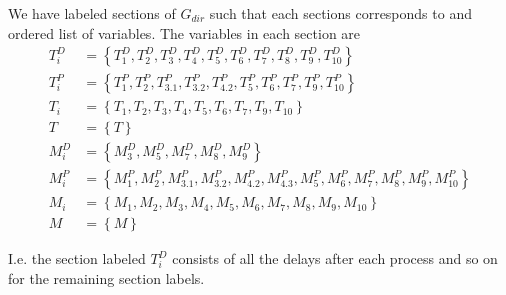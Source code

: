 \documentclass[../Thesis.tex]{subfiles}
\begin{document}
We have labeled sections of $G_{dir}$ such that each sections corresponds to and ordered list of variables. The variables in each section are
\begin{equation}\label{eq:Cycle data sets of variables}
    \begin{aligned}
        T_i^D & = \left\{ T^D_1, T^D_2, T^D_3, T^D_4, T^D_5, T^D_6, T^D_7, T^D_8, T^D_9, T^D_{10} \right\}                                 \\
        T^P_i & = \left\{ T^P_1, T^P_2, T^P_{3.1}, T^P_{3.2}, T^P_{4.2}, T^P_{5}, T^P_{6}, T^P_{7}, T^P_9, T^P_{10}\right\}                \\
        T_i   & = \left\{T_1, T_2, T_3, T_4, T_5, T_6, T_7, T_9, T_{10}\right\}                                                            \\
        T     & = \left\{T\right\}                                                                                                         \\
        M^D_i & = \left\{ M^D_3, M^D_5, M^D_7, M^D_8, M^D_9 \right\}                                                                       \\
        M^P_i & = \left\{ M^P_1, M^P_2, M^P_{3.1}, M^P_{3.2}, M^P_{4.2}, M^P_{4.3}, M^P_{5}, M^P_6, M^P_7, M^P_8, M^P_9, M^P_{10} \right\} \\
        M_i   & = \left\{M_1, M_2, M_3, M_4, M_5, M_6, M_7, M_8, M_9, M_{10}\right\}                                                       \\
        M     & = \left\{M\right\}
    \end{aligned}
\end{equation}

I.e. the section labeled $T^D_i$ consists of all the delays after each process and so on for the remaining section labels.
\end{document}

